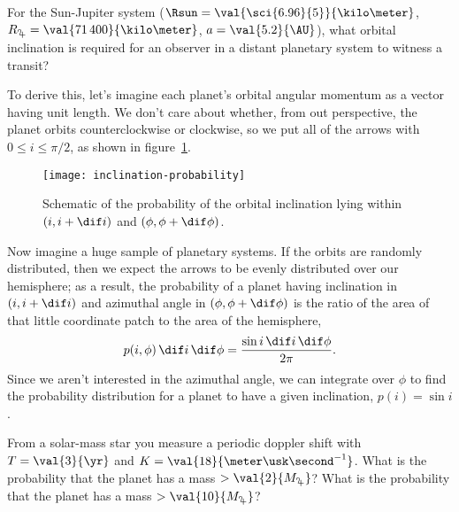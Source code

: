 \begin{exercisebox}
For the Sun-Jupiter system ($\Rsun = \val{\sci{6.96}{5}}{\kilo\meter}$, $R_{\jupiter}=\val{71\,400}{\kilo\meter}$, $a = \val{5.2}{\AU}$), what orbital inclination is required for an observer in a distant planetary system to witness a transit?
\end{exercisebox}

To derive this, let's imagine each planet's orbital angular momentum as a vector having unit length.  We don't care about whether, from out perspective, the planet orbits counterclockwise or clockwise, so we put all of the arrows with $0\le i\le \pi/2$, as shown in figure~\ref{f.inclination-probability}.  

\begin{figure}[ht]
\texttt{[image: inclination-probability]}
\caption[Schematic of the probability distribution of orbital inclination]{Schematic of the probability of the orbital inclination lying within $(i,i+\dif i)$ and $(\phi,\phi+\dif\phi)$.}
\label{f.inclination-probability}
\end{figure}

Now imagine a huge sample of planetary systems.  If the orbits are randomly distributed, then we expect the arrows to be evenly distributed over our hemisphere; as a result, the probability of a planet having inclination in $(i,i+\dif i)$ and azimuthal angle in $(\phi,\phi+\dif\phi)$ is the ratio of the area of that little coordinate patch to the area of the hemisphere,
\[ p(i,\phi)\,\dif i\,\dif \phi = \frac{\sin i\,\dif i\,\dif\phi}{2\pi}. \]
Since we aren't interested in the azimuthal angle, we can integrate over $\phi$ to find the probability distribution for a planet to have a given inclination, $p(i) = \sin i$.


\begin{exercisebox}
From a solar-mass star you measure a periodic doppler shift with $T = \val{3}{\yr}$ and $K = \val{18}{\meter\usk\second^{-1}}$.  What is the probability that the planet has a mass $>\val{2}{M_{\jupiter}}$? What is the probability that the planet has a mass $>\val{10}{M_{\jupiter}}$?
\end{exercisebox}

